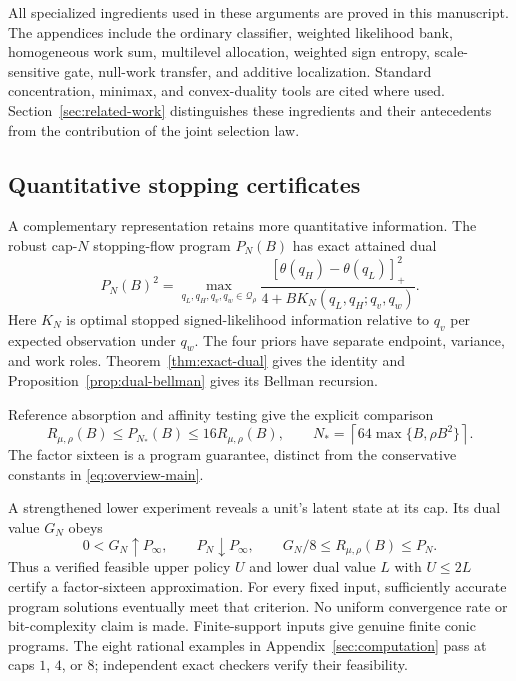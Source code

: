 All specialized ingredients used in these arguments are proved in this
manuscript. The appendices include the ordinary classifier, weighted
likelihood bank, homogeneous work sum, multilevel allocation, weighted
sign entropy, scale-sensitive gate, null-work transfer, and additive
localization. Standard concentration, minimax, and convex-duality tools
are cited where used. Section~\ref{sec:related-work} distinguishes these
ingredients and their antecedents from the contribution of the joint
selection law.

\subsection{Quantitative stopping certificates}

A complementary representation retains more quantitative information.
The robust cap-$N$ stopping-flow program $P_N(B)$ has exact attained dual
\[
 P_N(B)^2=
 \max_{q_L,q_H,q_v,q_w\in\mathcal Q_\rho}
 \frac{[\theta(q_H)-\theta(q_L)]_+^2}
 {4+B K_N(q_L,q_H;q_v,q_w)}.
\]
Here $K_N$ is optimal stopped signed-likelihood information relative to
$q_v$ per expected observation under $q_w$.
The four priors have separate endpoint, variance, and work roles.
Theorem~\ref{thm:exact-dual} gives the identity and
Proposition~\ref{prop:dual-bellman} gives its Bellman recursion.

Reference absorption and affinity testing give the explicit comparison
\begin{equation}\label{eq:overview-program}
 R_{\mu,\rho}(B)\le P_{N_*}(B)\le16R_{\mu,\rho}(B),
 \qquad
 N_*=\left\lceil64\max\{B,\rho B^2\}\right\rceil.
\end{equation}
The factor sixteen is a program guarantee, distinct from the conservative
constants in \eqref{eq:overview-main}.

A strengthened lower experiment reveals a unit's latent state at its cap.
Its dual value $G_N$ obeys
\[
 0<G_N\uparrow P_\infty,\qquad
 P_N\downarrow P_\infty,\qquad
 G_N/8\le R_{\mu,\rho}(B)\le P_N.
\]
Thus a verified feasible upper policy $U$ and lower dual value $L$ with
$U\le2L$ certify a factor-sixteen approximation. For every fixed input,
sufficiently accurate program solutions eventually meet that criterion.
No uniform convergence rate or bit-complexity claim is made.
Finite-support inputs give genuine finite conic programs.
The eight rational examples in Appendix~\ref{sec:computation} pass at
caps $1$, $4$, or $8$; independent exact checkers verify their feasibility.

